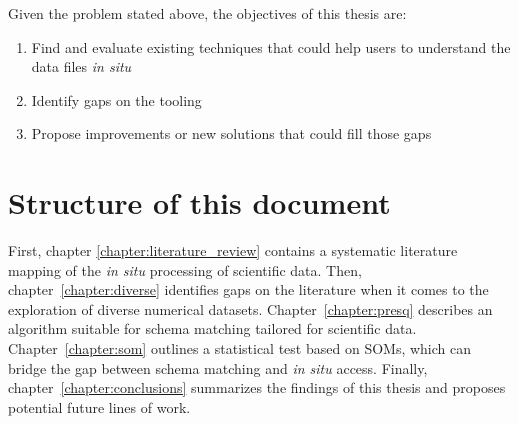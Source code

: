 Given the problem stated above, the objectives of this thesis are:

\begin{enumerate}
    \item Find and evaluate existing techniques that could help users to understand the data files
        \emph{in situ}
    \item Identify gaps on the tooling
    \item Propose improvements or new solutions that could fill those gaps
    \label{enum:objectives}
\end{enumerate}

\section{Structure of this document}

First, chapter \ref{chapter:literature_review} contains a systematic literature mapping of the
\emph{in situ} processing of scientific data.
Then, chapter~\ref{chapter:diverse} identifies gaps on the literature when it comes to the exploration
of diverse numerical datasets.
Chapter~\ref{chapter:presq} describes an algorithm
suitable for schema matching tailored for scientific data. Chapter~\ref{chapter:som}
outlines a statistical test based on \glspl{SOM}, which can bridge the gap
between schema matching and \emph{in situ} access. Finally, chapter~\ref{chapter:conclusions}
summarizes the findings of this thesis and proposes potential future lines of work.
